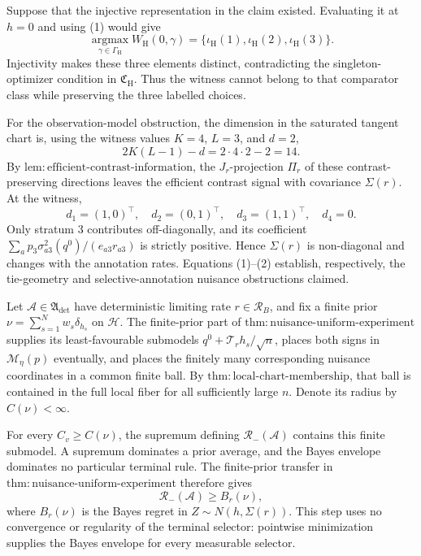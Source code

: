 Suppose that the injective representation in the claim existed.  Evaluating it at \(h=0\) and using (1) would give
\[
 \operatorname*{argmax}_{\gamma\in\Gamma_{\mathrm H}}W_{\mathrm H}(0,\gamma)
 =\{\iota_{\mathrm H}(1),\iota_{\mathrm H}(2),\iota_{\mathrm H}(3)\}.
\]
Injectivity makes these three elements distinct, contradicting the singleton-optimizer condition in \(\mathfrak C_{\mathrm H}\).  Thus the witness cannot belong to that comparator class while preserving the three labelled choices.

For the observation-model obstruction, the dimension in the saturated tangent chart is, using the witness values \(K=4\), \(L=3\), and \(d=2\),
\[
 2K(L-1)-d=2\cdot4\cdot2-2=14.                                     \tag{2}
\]
By \(\mathrm{lem:efficient\text{-}contrast\text{-}information}\), the \(J_r\)-projection \(\Pi_r\) of these contrast-preserving directions leaves the efficient contrast signal with covariance \(\Sigma(r)\).  At the witness,
\[
 d_1=(1,0)^\top,\quad d_2=(0,1)^\top,\quad d_3=(1,1)^\top,\quad d_4=0.
\]
Only stratum \(3\) contributes off-diagonally, and its coefficient \(\sum_a p_3\sigma^2_{a3}(q^0)/(e_{a3}r_{a3})\) is strictly positive.  Hence \(\Sigma(r)\) is non-diagonal and changes with the annotation rates.  Equations (1)--(2) establish, respectively, the tie-geometry and selective-annotation nuisance obstructions claimed.

Let \(\mathcal A\in\mathfrak A_{\mathrm{det}}\) have deterministic limiting rate \(r\in\mathcal R_B\), and fix a finite prior \(\nu=\sum_{s=1}^Nw_s\delta_{h_s}\) on \(\mathcal H\).  The finite-prior part of \(\mathrm{thm:nuisance\text{-}uniform\text{-}experiment}\) supplies its least-favourable submodels \(q^0+\mathcal T_rh_s/\sqrt n\), places both signs in \(\mathcal M_\eta(p)\) eventually, and places the finitely many corresponding nuisance coordinates in a common finite ball.  By \(\mathrm{thm:local\text{-}chart\text{-}membership}\), that ball is contained in the full local fiber for all sufficiently large \(n\).  Denote its radius by \(C(\nu)<\infty\).

For every \(C_v\geq C(\nu)\), the supremum defining \(\mathcal R_-(\mathcal A)\) contains this finite submodel.  A supremum dominates a prior average, and the Bayes envelope dominates no particular terminal rule.  The finite-prior transfer in \(\mathrm{thm:nuisance\text{-}uniform\text{-}experiment}\) therefore gives
\[
 \mathcal R_-(\mathcal A)\geq B_r(\nu),                              \tag{1}
\]
where \(B_r(\nu)\) is the Bayes regret in \(Z\sim N(h,\Sigma(r))\).  This step uses no convergence or regularity of the terminal selector: pointwise minimization supplies the Bayes envelope for every measurable selector.

